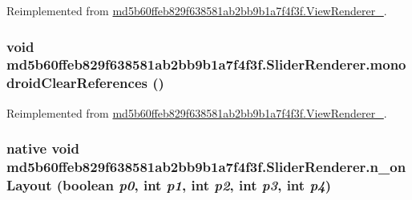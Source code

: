 Reimplemented from \hyperlink{classmd5b60ffeb829f638581ab2bb9b1a7f4f3f_1_1_view_renderer__2_64ca8244a89f60a47c173d9c0b15d610}{md5b60ffeb829f638581ab2bb9b1a7f4f3f.ViewRenderer\_}.\hypertarget{classmd5b60ffeb829f638581ab2bb9b1a7f4f3f_1_1_slider_renderer_9db5ee8d3adfe5077ce514f56e2a5984}{
\subsubsection[{monodroidClearReferences}]{\setlength{\rightskip}{0pt plus 5cm}void md5b60ffeb829f638581ab2bb9b1a7f4f3f.SliderRenderer.monodroidClearReferences ()}}
\label{classmd5b60ffeb829f638581ab2bb9b1a7f4f3f_1_1_slider_renderer_9db5ee8d3adfe5077ce514f56e2a5984}




Reimplemented from \hyperlink{classmd5b60ffeb829f638581ab2bb9b1a7f4f3f_1_1_view_renderer__2_dae20979ac761a65aa60c9b427509c37}{md5b60ffeb829f638581ab2bb9b1a7f4f3f.ViewRenderer\_}.\hypertarget{classmd5b60ffeb829f638581ab2bb9b1a7f4f3f_1_1_slider_renderer_77b7da7854dd07e25a132e99b1f712ad}{
\subsubsection[{n\_\-onLayout}]{\setlength{\rightskip}{0pt plus 5cm}native void md5b60ffeb829f638581ab2bb9b1a7f4f3f.SliderRenderer.n\_\-onLayout (boolean {\em p0}, \/  int {\em p1}, \/  int {\em p2}, \/  int {\em p3}, \/  int {\em p4})}}
\label{classmd5b60ffeb829f638581ab2bb9b1a7f4f3f_1_1_slider_renderer_77b7da7854dd07e25a132e99b1f712ad}





